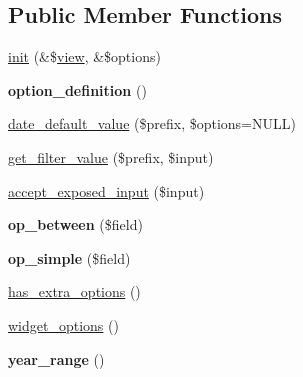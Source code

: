 \subsection*{Public Member Functions}
\begin{DoxyCompactItemize}
\item 
\hyperlink{classdate__views__filter__handler__simple_ad88e187cbc6c8f5a48f4ad9daf83fff8}{init} (\&\$\hyperlink{classview}{view}, \&\$options)
\item 
\hypertarget{classdate__views__filter__handler__simple_a961de76f24e0dad88caf398daee3d556}{
{\bfseries option\_\-definition} ()}
\label{classdate__views__filter__handler__simple_a961de76f24e0dad88caf398daee3d556}

\item 
\hyperlink{classdate__views__filter__handler__simple_a0c2dc5d14e6b72f16fcdcf5e629fc2d3}{date\_\-default\_\-value} (\$prefix, \$options=NULL)
\item 
\hyperlink{classdate__views__filter__handler__simple_ae36b57d4f13b4d13a6e3460cf8481720}{get\_\-filter\_\-value} (\$prefix, \$input)
\item 
\hyperlink{classdate__views__filter__handler__simple_af129fdbfc4ec0a307289b09e25bd5190}{accept\_\-exposed\_\-input} (\$input)
\item 
\hypertarget{classdate__views__filter__handler__simple_abe6d8aa4f3c2a5f07f9a497478540642}{
{\bfseries op\_\-between} (\$field)}
\label{classdate__views__filter__handler__simple_abe6d8aa4f3c2a5f07f9a497478540642}

\item 
\hypertarget{classdate__views__filter__handler__simple_ace626a4b60216d04870c9ee5be13b16a}{
{\bfseries op\_\-simple} (\$field)}
\label{classdate__views__filter__handler__simple_ace626a4b60216d04870c9ee5be13b16a}

\item 
\hyperlink{classdate__views__filter__handler__simple_ad1e692e5222cc417dcd83cdbdac1a270}{has\_\-extra\_\-options} ()
\item 
\hyperlink{classdate__views__filter__handler__simple_ada529cd1430ae95542d8f3531f777e90}{widget\_\-options} ()
\item 
\hypertarget{classdate__views__filter__handler__simple_af27e14934e92345308c5ceabd49822a5}{
{\bfseries year\_\-range} ()}
\label{classdate__views__filter__handler__simple_af27e14934e92345308c5ceabd49822a5}


\end{DoxyCompactItemize}
